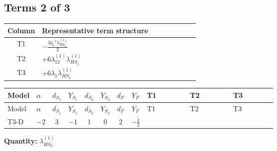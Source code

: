 \documentclass[8pt]{article}
\begin{document}
\begin{landscape}
\subsection*{Terms 2 of 3}
\begin{center}
\begin{tabular}{@{}c >{\raggedright\arraybackslash}p{0.82\linewidth}@{}}
\toprule
Column & Representative term structure \\
\midrule
T1 & \(\displaystyle -\frac{3 {g_1}^2 {\lambda_{HS_2}^{(1)}}}{2}\) \\
\midrule
T2 & \(\displaystyle +6 {\lambda_{12}^{(1)}} {\lambda_{HS_1}^{(1)}}\) \\
\midrule
T3 & \(\displaystyle +6 {\lambda_1} {\lambda_{HS_2}^{(1)}}\) \\
\midrule
\bottomrule
\end{tabular}
\end{center}
\smallskip
\tiny
\begin{longtable}{@{}llcccccc >{\raggedright\arraybackslash}p{0.21\linewidth} >{\raggedright\arraybackslash}p{0.21\linewidth} >{\raggedright\arraybackslash}p{0.21\linewidth}@{}}
\toprule
Model & $\alpha$ & $d_{S_1}$ & $Y_{S_1}$ & $d_{S_2}$ & $Y_{S_2}$ & $d_F$ & $Y_F$ & T1 & T2 & T3 \\
\midrule
\endfirsthead
\toprule
Model & $\alpha$ & $d_{S_1}$ & $Y_{S_1}$ & $d_{S_2}$ & $Y_{S_2}$ & $d_F$ & $Y_F$ & T1 & T2 & T3 \\
\midrule
\endhead
T3-D & $-2$ & $3$ & $-1$ & $1$ & $0$ & $2$ & $-\frac{1}{2}$ & \scriptsize\adjustbox{max width=\linewidth}{$\begin{gathered} -\frac{3 {g_1}^2 {\lambda_{HS_2}^{(1)}}}{2}\end{gathered}$} & \scriptsize\adjustbox{max width=\linewidth}{$\begin{gathered} +6 {\lambda_{12}^{(1)}} {\lambda_{HS_1}^{(1)}}\end{gathered}$} & \scriptsize\adjustbox{max width=\linewidth}{$\begin{gathered} +6 {\lambda_1} {\lambda_{HS_2}^{(1)}}\end{gathered}$} \\
\midrule
\bottomrule
\end{longtable}
\clearpage
\noindent\textbf{Quantity: }$\lambda_{HS_2}^{(1)}$\par\smallskip

\end{landscape}
\end{document}
